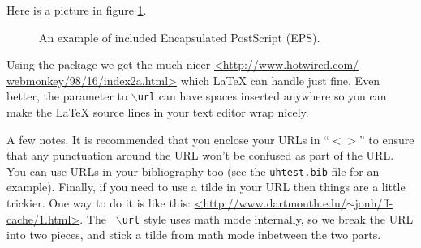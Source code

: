 Here is a picture in figure \ref{fig:example-1}.

\begin{figure}[htbp]
  \centering
  \caption{An example of included Encapsulated PostScript (EPS).}
  \label{fig:example-1}
\end{figure}

Using the package we get the much nicer \url{<http://www.hotwired.com/
webmonkey/98/16/index2a.html>} which LaTeX can handle just fine. Even better,
the parameter to {\tt $\backslash$url} can have spaces inserted anywhere so you
can make the LaTeX source lines in your text editor wrap nicely.

A few notes. It is recommended that you enclose your URLs in ``$<>$'' to ensure
that any punctuation around the URL won't be confused as part of the URL. You
can use URLs in your bibliography too (see the {\tt uhtest.bib} file for an
example). Finally, if you need to use a tilde in your URL then things are a
little trickier. One way to do it is like this:
\url{<http://www.dartmouth.edu/}$\sim$\url{jonh/ff-cache/1.html>}. The {\tt
$\backslash$url} style uses math mode internally, so we break the URL into two
pieces, and stick a tilde from math mode inbetween the two parts.

